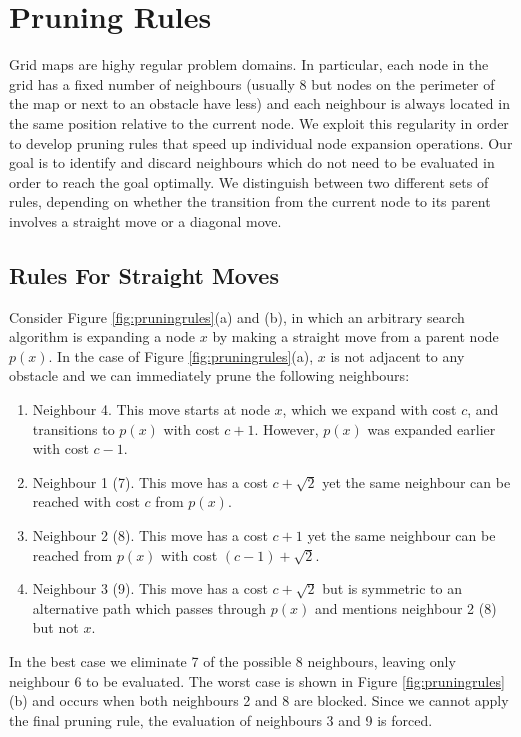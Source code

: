 \section{Pruning Rules}
Grid maps are highy regular problem domains. 
In particular, each node in the grid has a fixed number of neighbours (usually
8 but nodes on the perimeter of the map or next to an obstacle have less) and each
neighbour is always located in the same position relative to the current node.
We exploit this regularity in order to develop pruning rules that speed up 
individual node expansion operations.
Our goal is to identify and discard neighbours
which do not need to be evaluated in order to reach the goal optimally.
We distinguish between two different sets of rules, depending on whether the 
transition from the current node to its parent involves a straight move or a
diagonal move.


\subsection{Rules For Straight Moves}
Consider Figure \ref{fig:pruningrules}(a) and (b), in which an arbitrary search 
algorithm is expanding a node $x$ by making a straight move from a parent node 
$p(x)$.
In the case of Figure \ref{fig:pruningrules}(a), $x$ is not adjacent to any obstacle and 
we can immediately prune the following neighbours:
\begin{enumerate}
\item Neighbour 4. This move starts at node $x$, which we expand with cost $c$, and 
transitions to $p(x)$ with cost $c + 1$. However, $p(x)$ was expanded earlier 
with cost $c - 1$.
\item Neighbour 1 (7). This move has a cost $c  + \sqrt2$ yet the same neighbour 
can be reached with cost $c$ from $p(x)$.
\item Neighbour 2 (8). This move has a cost $c + 1$ yet the same neighbour  can
be reached from $p(x)$ with cost $(c - 1) + \sqrt2$. 
\item Neighbour 3 (9). This move has a cost $c + \sqrt2$ but is
symmetric to an alternative path which passes through $p(x)$ and mentions 
neighbour 2 (8) but not $x$.
\end{enumerate}
\noindent
In the best case we eliminate 7 of the possible 8 neighbours, leaving only
neighbour 6 to be evaluated. 
The worst case is shown in Figure \ref{fig:pruningrules}(b) and occurs when both 
neighbours 2 and 8 are blocked. Since we cannot apply the final pruning rule, 
the evaluation of neighbours 3 and 9 is forced.

